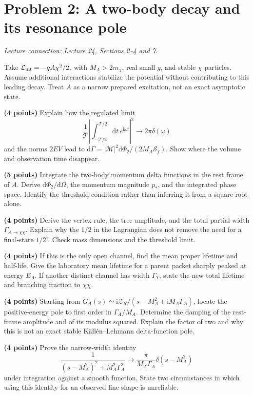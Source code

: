 \documentclass[11pt]{article}
\newcommand{\dd}{\mathrm d}
\newcommand{\ii}{\mathrm i}
\newcommand{\Lag}{\mathcal L}
\newcommand{\cM}{\mathcal M}
\newcommand{\cS}{\mathcal S}
\newcommand{\problem}[2]{\clearpage\section*{\color{qftblue}Problem #1: #2}}
\newcommand{\connection}[1]{{\small\textit{Lecture connection: #1}\par}\medskip}
\begin{document}
\problem{2}{A two-body decay and its resonance pole}
\connection{Lecture 24, Sections 2--4 and 7.}
Take \(\Lag_{\rm int}=-gA\chi^2/2\), with \(M_A>2m_\chi\), real small
\(g\), and stable \(\chi\) particles. Assume additional interactions
stabilize the potential without contributing to this leading decay.
Treat \(A\) as a narrow prepared excitation, not an exact asymptotic state.
\begin{parts}
\item \textbf{(4 points)} Explain how the regulated limit
\[
 \frac1{\mathcal T}\left|\int_{-\mathcal T/2}^{\mathcal T/2}
 \dd t\,e^{\ii\omega t}\right|^2\longrightarrow2\pi\delta(\omega)
\]
and the norms \(2EV\) lead to
\(\dd\Gamma=|\cM|^2\dd\Phi_2/(2M_A\cS_f)\).
Show where the volume and observation time disappear.

\item \textbf{(5 points)} Integrate the two-body momentum delta functions
in the rest frame of \(A\). Derive \(\dd\Phi_2/\dd\Omega\), the momentum
magnitude \(p_*\), and the integrated phase space. Identify the threshold
condition rather than inferring it from a square root alone.

\item \textbf{(4 points)} Derive the vertex rule, the tree amplitude,
and the total partial width \(\Gamma_{A\to\chi\chi}\). Explain why the
\(1/2\) in the Lagrangian does not remove the need for a final-state
\(1/2!\). Check mass dimensions and the threshold limit.

\item \textbf{(4 points)} If this is the only open channel, find the mean
proper lifetime and half-life. Give the laboratory mean lifetime for a
parent packet sharply peaked at energy \(E_A\). If another distinct channel
has width \(\Gamma_Y\), state the new total lifetime and branching fraction
to \(\chi\chi\).

\item \textbf{(4 points)} Starting from
\(\widetilde G_A(s)\simeq\ii\mathcal Z_R/(s-M_A^2+\ii M_A\Gamma_A)\),
locate the positive-energy pole to first order in \(\Gamma_A/M_A\).
Determine the damping of the rest-frame amplitude and of its modulus
squared. Explain the factor of two and why this is not an exact stable
K\"all\'en--Lehmann delta-function pole.

\item \textbf{(4 points)} Prove the narrow-width identity
\[
 \frac1{(s-M_A^2)^2+M_A^2\Gamma_A^2}
 \longrightarrow\frac{\pi}{M_A\Gamma_A}\delta(s-M_A^2)
\]
under integration against a smooth function. State two circumstances in
which using this identity for an observed line shape is unreliable.
\end{parts}
\end{document}
